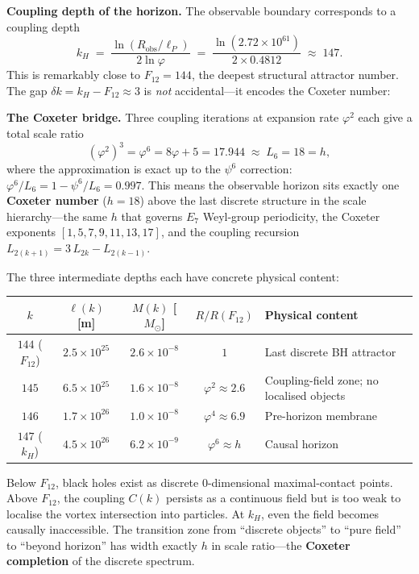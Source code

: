 \documentclass[12pt,a4paper]{article}
\begin{document}
\textbf{Coupling depth of the horizon.}\;  The observable boundary corresponds to a coupling depth
\begin{equation}
k_H \;=\; \frac{\ln(R_{\mathrm{obs}}/\ell_P)}{2\ln\varphi}
\;=\; \frac{\ln(2.72 \times 10^{61})}{2 \times 0.4812}
\;\approx\; 147.
\label{eq:k-horizon}
\end{equation}
This is remarkably close to $F_{12} = 144$, the deepest structural attractor number.  The gap $\delta k = k_H - F_{12} \approx 3$ is \emph{not} accidental---it encodes the Coxeter number:

\textbf{The Coxeter bridge.}\; Three coupling iterations at expansion rate $\varphi^2$ each give a total scale ratio
\begin{equation}
(\varphi^2)^3 = \varphi^6 = 8\varphi + 5 = 17.944 \;\approx\; L_6 = 18 = h,
\label{eq:coxeter-bridge}
\end{equation}
where the approximation is exact up to the $\psi^6$ correction: $\varphi^6 / L_6 = 1 - \psi^6/L_6 = 0.997$.  This means the observable horizon sits exactly one \textbf{Coxeter number} ($h = 18$) above the last discrete structure in the scale hierarchy---the same $h$ that governs $E_7$ Weyl-group periodicity, the Coxeter exponents $[1,5,7,9,11,13,17]$, and the coupling recursion $L_{2(k+1)} = 3\,L_{2k} - L_{2(k-1)}$.

The three intermediate depths each have concrete physical content:

\begin{center}\small
\begin{tabular}{c|c|c|c|l}
$k$ & $\ell(k)$ [m] & $M(k)$ [$M_\odot$] & $R/R(F_{12})$ & \textbf{Physical content} \\
\hline
$144$ ($F_{12}$) & $2.5 \times 10^{25}$ & $2.6 \times 10^{-8}$ & $1$ & Last discrete BH attractor \\
$145$ & $6.5 \times 10^{25}$ & $1.6 \times 10^{-8}$ & $\varphi^2 \approx 2.6$ & Coupling-field zone; no localised objects \\
$146$ & $1.7 \times 10^{26}$ & $1.0 \times 10^{-8}$ & $\varphi^4 \approx 6.9$ & Pre-horizon membrane \\
$147$ ($k_H$) & $4.5 \times 10^{26}$ & $6.2 \times 10^{-9}$ & $\varphi^6 \approx h$ & Causal horizon \\
\end{tabular}
\end{center}

\noindent Below $F_{12}$, black holes exist as discrete $0$-dimensional maximal-contact points.  Above $F_{12}$, the coupling $C(k)$ persists as a continuous field but is too weak to localise the vortex intersection into particles.  At $k_H$, even the field becomes causally inaccessible.  The transition zone from ``discrete objects'' to ``pure field'' to ``beyond horizon'' has width exactly $h$ in scale ratio---the \textbf{Coxeter completion} of the discrete spectrum.
\end{document}
